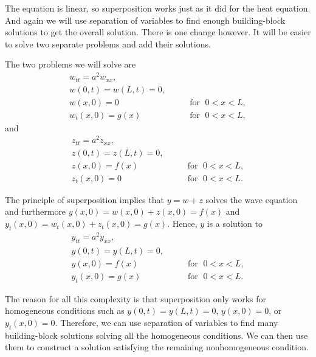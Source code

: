 \documentclass{ximera}
\begin{document}
The equation is linear, so superposition works just as it did for the heat equation.  And again we will use separation of variables to find enough building-block solutions to get the overall solution.  There is one change however.  It will be easier to solve two separate problems and add their solutions.

The two problems we will solve are
\begin{equation} \label{wave:weq}
    \begin{array}{ll}
        w_{tt} = a^2 w_{xx} , &  \\
        w(0,t) = w(L,t) = 0 , &  \\
        w(x,0) = 0 & \qquad \text{for } \; 0 < x < L , \\
        w_t(x,0) = g(x) & \qquad \text{for } \; 0 < x < L ,
    \end{array}
\end{equation}
and
\begin{equation} \label{wave:zeq}
    \begin{array}{ll}
        z_{tt} = a^2 z_{xx} , &  \\
        z(0,t) = z(L,t) = 0 , &  \\
        z(x,0) = f(x) & \qquad \text{for } \; 0 < x < L , \\
        z_t(x,0) = 0 & \qquad \text{for } \; 0 < x < L .
    \end{array}
\end{equation}

The principle of superposition implies that $y = w + z$ solves the wave equation and furthermore $y(x,0) = w(x,0) + z(x,0) = f(x)$ and $y_t(x,0) = w_t(x,0) + z_t(x,0) = g(x)$.  Hence, $y$ is a solution to
\begin{equation} \label{wave:yeq}
    \begin{array}{ll}
        y_{tt} = a^2 y_{xx} , &  \\
        y(0,t) = y(L,t) = 0 , &  \\
        y(x,0) = f(x) & \qquad \text{for } \; 0 < x < L , \\
        y_t(x,0) = g(x) & \qquad \text{for } \; 0 < x < L .
    \end{array}
\end{equation}

The reason for all this complexity is that superposition only works for homogeneous conditions such as $y(0,t) = y(L,t) = 0$, $y(x,0) = 0$, or $y_t(x,0) = 0$.  Therefore, we can use separation of variables to find many building-block solutions solving all the homogeneous conditions.  We can then use them to construct a solution satisfying the remaining nonhomogeneous condition.
\end{document}
